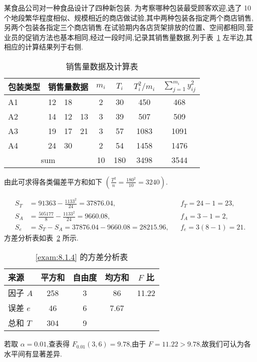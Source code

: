 \begin{example}\label{exam:8.1.4}
某食品公司对一种食品设计了四种新包装. 为考察哪种包装最受顾客欢迎,选了 10 个地段繁华程度相似、规模相近的商店做试验,其中两种包装各指定两个商店销售,另两个包装各指定三个商店销售.在试验期内各店货架排放的位置、空间都相同,营业员的促销方法也基本相同,经过一段时间,记录其销售量数据,列于表~\ref{tab:8.1.6} 左半边,其相应的计算结果列于右侧.
\begin{table}[htbp]
  \centering
  \caption{销售量数据及计算表}
    \begin{tabular}{cccccccc}
    \toprule
    包装类型 & \multicolumn{3}{c}{销售量数据} & $m_i$ & $T_i$ &$T_i^2/m_i$ & $\sum_{j=1}^{m_i} y_{ij}^2$ \\
    \midrule
    \multicolumn{1}{l}{A1} & \multicolumn{1}{r}{12} & \multicolumn{1}{r}{18} &       & 2     & 30    & 450   & 468 \\
    \multicolumn{1}{l}{A2} & \multicolumn{1}{r}{14} & \multicolumn{1}{r}{12} & \multicolumn{1}{r}{13} & 3     & 39    & 507   & 509 \\
    \multicolumn{1}{l}{A3} & \multicolumn{1}{r}{19} & \multicolumn{1}{r}{17} & \multicolumn{1}{r}{21} & 3     & 57    & 1083  & 1091 \\
    \multicolumn{1}{l}{A4} & \multicolumn{1}{r}{24} & \multicolumn{1}{r}{30} &       & 2     & 54    & 1458  & 1476 \\
    \midrule
    \multicolumn{4}{c}{sum}       & 10    & 180   & 3498  & 3544 \\
    \bottomrule
    \end{tabular}%
  \label{tab:8.1.6}%
\end{table}%

由此可求得各类偏差平方和如下 $\left(\frac{T^{2}}{n}=\frac{180^{2}}{10}=3240\right)$.


\begin{align*}
  S_T & = 91363 - \frac{1133^2}{24} = 37876.04, && f_T = 24-1=23,\\
  S_A &= \frac{505177}{8} - \frac{1133^2}{24} = 9660.08, && f_A = 3 - 1 = 2,\\
  S_e &= S_{T} - S_A = 37876.04 - 9660.08 = 28215.96, && f_{e} = 3(8-1)=21.
\end{align*}
方差分析表如表~\ref{tab:8.1.7} 所示.

  \begin{table}[htbp]
    \centering
    \caption{\ref{exam:8.1.4} 的方差分析表}
      \begin{tabular}{lcccc}
      \toprule
      来源    & 平方和   & 自由度   & 均方和   & $F$ 比 \\
      \midrule
      因子 $A$  & 258 & 3    & 86 & 11.22 \\
      误差 $e$  & 46 & 6    & 7.67 &  \\
      总和 $T$  & 304 & 9    &       &  \\
      \bottomrule
      \end{tabular}%
    \label{tab:8.1.7}%
  \end{table}%
  若取 $\alpha=0.01$,查表得 $F_{0.01}(3,6)=9.78$,由于 $F = 11.22 > 9.78$,故我们可认为各水平间有显著差异.


\end{example}
